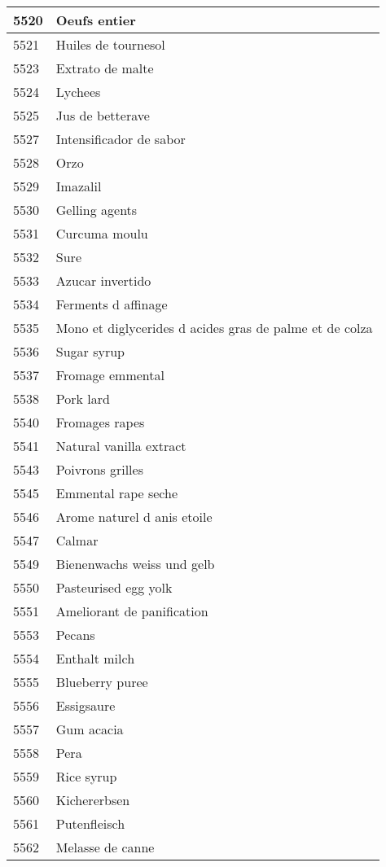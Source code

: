 \begin{longtable}{|l|l|}
5520 & Oeufs entier \\ \hline 
5521 & Huiles de tournesol \\ \hline 
5523 & Extrato de malte \\ \hline 
5524 & Lychees \\ \hline 
5525 & Jus de betterave \\ \hline 
5527 & Intensificador de sabor \\ \hline 
5528 & Orzo \\ \hline 
5529 & Imazalil \\ \hline 
5530 & Gelling agents \\ \hline 
5531 & Curcuma moulu \\ \hline 
5532 & Sure \\ \hline 
5533 & Azucar invertido \\ \hline 
5534 & Ferments d affinage \\ \hline 
5535 & Mono et diglycerides d acides gras de palme et de colza \\ \hline 
5536 & Sugar syrup \\ \hline 
5537 & Fromage emmental \\ \hline 
5538 & Pork lard \\ \hline 
5540 & Fromages rapes \\ \hline 
5541 & Natural vanilla extract \\ \hline 
5543 & Poivrons grilles \\ \hline 
5545 & Emmental rape seche \\ \hline 
5546 & Arome naturel d anis etoile \\ \hline 
5547 & Calmar \\ \hline 
5549 & Bienenwachs weiss und gelb \\ \hline 
5550 & Pasteurised egg yolk \\ \hline 
5551 & Ameliorant de panification \\ \hline 
5553 & Pecans \\ \hline 
5554 & Enthalt milch \\ \hline 
5555 & Blueberry puree \\ \hline 
5556 & Essigsaure \\ \hline 
5557 & Gum acacia \\ \hline 
5558 & Pera \\ \hline 
5559 & Rice syrup \\ \hline 
5560 & Kichererbsen \\ \hline 
5561 & Putenfleisch \\ \hline 
5562 & Melasse de canne \\ \hline 

\end{longtable}
